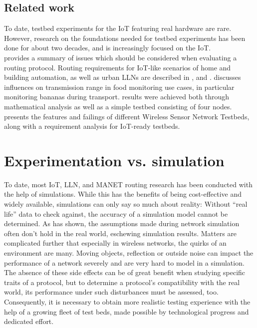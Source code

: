 \documentclass{acm_proc_article-sp}
\begin{document}
\subsection{Related work}
\label{subsec:related_work}
To date, testbed experiments for the IoT featuring real hardware are rare. However, research on the foundations needed for testbed experiments has been done for about two decades, and is increasingly focused on the IoT.\\
\cite{RFC-2501} provides a summary of issues which should be considered when evaluating a routing protocol. Routing requirements for IoT-like scenarios of home and building automation, as well as urban \glspl{LLN} are described in \cite{RFC-5826}, \cite{RFC-5867} and \cite{RFC-5548}.
\cite{food_monitoring} discusses influences on transmission range in food monitoring use cases, in particular monitoring bananas during transport. results were achieved both through mathematical analysis as well as a simple testbed consisting of four nodes.
\cite{testbed-survey} presents the features and failings of different Wireless Sensor Network Testbeds, along with a requirement analysis for IoT-ready testbeds.

\section{Experimentation vs. simulation}
\label{sec:simulation_cons}
To date, most IoT, \gls{LLN}, and \gls{MANET} routing research has been conducted with the help of simulations. While this has the benefits of being cost-effective and widely available, simulations can only say so much about reality:
Without ``real life'' data to check against, the accuracy of a simulation model cannot be determined. As \cite{mistaken-axioms} has shown, the assumptions made during network simulation often don't hold in the real world, eschewing simulation results.
Matters are complicated further that especially in wireless networks, the quirks of an environment are many. Moving objects, reflection or outside noise can impact the performance of a network severely and are very hard to model in a simulation. The absence of these side effects can be of great benefit when studying specific traits of a protocol, but to determine a protocol's compatibility with the real world, its performance under such disturbances must be assessed, too.\\
Consequently, it is necessary to obtain more realistic testing experience with the help of a growing fleet of test beds, made possible by technological progress and dedicated effort.
\newpage
\end{document}
